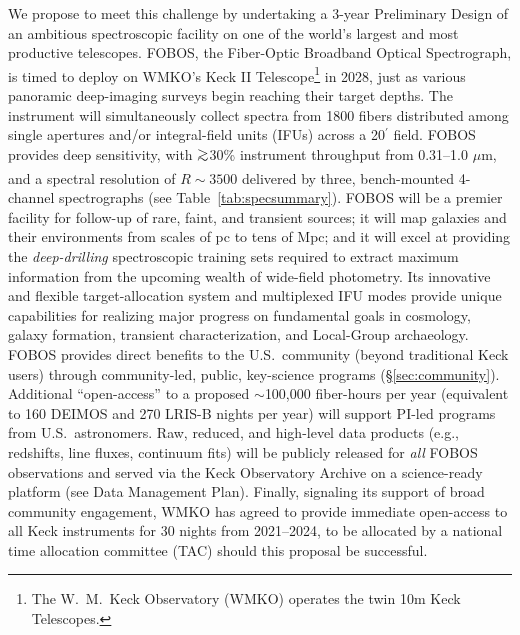 \documentclass[oneside,11pt]{amsart}
\newcommand{\note}[2][todo]{{\color{#1}[[{\bf #2}]]}}
\DeclareRobustCommand{\gtrsim}{%
\mathrel{\hskip-.5em\begin{array}{c}>\\[-8pt]\sim\end{array}\hskip-.5em}}
\begin{document}
We propose to meet this challenge by undertaking a 3-year Preliminary Design of an ambitious spectroscopic facility on one of the world's largest and most productive telescopes.  FOBOS, the Fiber-Optic Broadband Optical Spectrograph, is timed to deploy on WMKO's Keck II Telescope\footnote{The W.~M.\ Keck Observatory (WMKO) operates the twin 10m Keck Telescopes.} in 2028, just as various panoramic deep-imaging surveys begin reaching their target depths.  The instrument will simultaneously collect spectra from 1800 fibers distributed among single apertures and/or integral-field units (IFUs) across a 20$^\prime$ field.  FOBOS provides deep sensitivity, with $\gtrsim$30\% instrument throughput from 0.31--1.0 $\mu$m, and a spectral resolution of $R \sim 3500$ delivered by three, bench-mounted 4-channel spectrographs (see Table~\ref{tab:specsummary}).  FOBOS will be a premier facility for follow-up of rare, faint, and transient sources; it will map galaxies and their environments from scales of pc to tens of Mpc; and it will excel at providing the \emph{deep-drilling} spectroscopic training sets required to extract maximum information from the upcoming wealth of wide-field photometry. Its innovative and flexible target-allocation system and multiplexed IFU modes provide unique capabilities for realizing major progress on fundamental goals in cosmology, galaxy formation, transient characterization, and Local-Group archaeology. FOBOS provides direct benefits to the U.S.\ community (beyond traditional Keck users) through community-led, public, key-science programs (\S \ref{sec:community}). Additional ``open-access'' to a proposed $\sim$100,000 fiber-hours per year (equivalent to 160 DEIMOS and 270 LRIS-B nights per year) will support PI-led programs from U.S.\ astronomers. Raw, reduced, and high-level data products (e.g., redshifts, line fluxes, continuum fits) will be publicly released for \emph{all} FOBOS observations and served via the Keck Observatory Archive on a science-ready platform (see Data Management Plan).  Finally, signaling its support of broad community engagement, WMKO has agreed to provide immediate open-access to all Keck instruments for 30 nights from 2021--2024, to be allocated by a national time allocation committee (TAC) should this proposal be successful.

\end{document}
